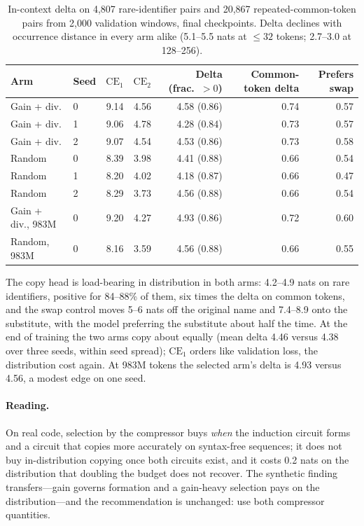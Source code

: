 \documentclass[11pt]{article}
\begin{document}
\begin{table}[t]\centering\small
\begin{tabular}{llrrrrr}\toprule
Arm & Seed & $\mathrm{CE}_1$ & $\mathrm{CE}_2$ & Delta (frac.\ $>0$) & Common-token delta & Prefers swap \\\midrule
Gain + div. & 0 & 9.14 & 4.56 & 4.58 (0.86) & 0.74 & 0.57 \\
Gain + div. & 1 & 9.06 & 4.78 & 4.28 (0.84) & 0.73 & 0.57 \\
Gain + div. & 2 & 9.07 & 4.54 & 4.53 (0.86) & 0.73 & 0.58 \\
Random      & 0 & 8.39 & 3.98 & 4.41 (0.88) & 0.66 & 0.54 \\
Random      & 1 & 8.20 & 4.02 & 4.18 (0.87) & 0.66 & 0.47 \\
Random      & 2 & 8.29 & 3.73 & 4.56 (0.88) & 0.66 & 0.54 \\\midrule
Gain + div., 983M & 0 & 9.20 & 4.27 & 4.93 (0.86) & 0.72 & 0.60 \\
Random, 983M      & 0 & 8.16 & 3.59 & 4.56 (0.88) & 0.66 & 0.55 \\\bottomrule
\end{tabular}
\caption{In-context delta on 4,807 rare-identifier pairs and 20,867
repeated-common-token pairs from 2,000 validation windows, final
checkpoints. Delta declines with occurrence distance in every arm alike
(5.1--5.5 nats at $\leq32$ tokens; 2.7--3.0 at 128--256).}
\label{tab:delta}
\end{table}

The copy head is load-bearing in distribution in both arms: 4.2--4.9 nats
on rare identifiers, positive for 84--88\% of them, six times the delta on
common tokens, and the swap control moves 5--6 nats off the original name
and 7.4--8.9 onto the substitute, with the model preferring the substitute
about half the time. At the end of training the two arms copy about
equally (mean delta 4.46 versus 4.38 over three seeds, within seed spread);
$\mathrm{CE}_1$ orders like validation loss, the distribution cost again.
At 983M tokens the selected arm's delta is 4.93 versus 4.56, a modest edge
on one seed.

\paragraph{Reading.}
On real code, selection by the compressor buys \emph{when} the induction
circuit forms and a circuit that copies more accurately on syntax-free
sequences; it does not buy in-distribution copying once both circuits
exist, and it costs 0.2 nats on the distribution that doubling the budget
does not recover. The synthetic finding transfers---gain governs formation
and a gain-heavy selection pays on the distribution---and the
recommendation is unchanged: use both compressor quantities.
\end{document}
